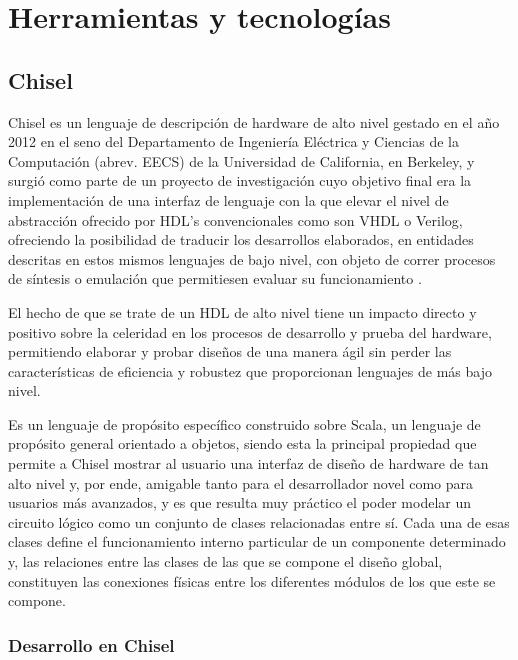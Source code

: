 \chapter{Herramientas y tecnologías}


\section{Chisel}

Chisel es un lenguaje de descripción de hardware de alto nivel gestado en el año 2012 en el seno del Departamento de Ingeniería Eléctrica y Ciencias de la Computación (abrev. EECS) de la Universidad de California, en Berkeley, y surgió como parte de un proyecto de investigación cuyo objetivo final era la implementación de una interfaz de lenguaje con la que elevar el nivel de abstracción ofrecido por HDL's convencionales como son VHDL o Verilog, ofreciendo la posibilidad de traducir los desarrollos elaborados, en entidades descritas en estos mismos lenguajes de bajo nivel, con objeto de correr procesos de síntesis o emulación que permitiesen evaluar su funcionamiento \cite{chiselEECS}.

El hecho de que se trate de un HDL de alto nivel tiene un impacto directo y positivo sobre la celeridad en los procesos de desarrollo y prueba del hardware, permitiendo elaborar y probar diseños de una manera ágil sin perder las características de eficiencia y robustez que proporcionan lenguajes de más bajo nivel.

Es un lenguaje de propósito específico construido sobre Scala, un lenguaje de propósito general orientado a objetos, siendo esta la principal propiedad que permite a Chisel mostrar al usuario una interfaz de diseño de hardware de tan alto nivel y, por ende, amigable tanto para el desarrollador novel como para usuarios más avanzados, y es que resulta muy práctico el poder modelar un circuito lógico como un conjunto de clases relacionadas entre sí. Cada una de esas clases define el funcionamiento interno particular de un componente determinado y, las relaciones entre las clases de las que se compone el diseño global, constituyen las conexiones físicas entre los diferentes módulos de los que este se compone.

\subsection{Desarrollo en Chisel}

